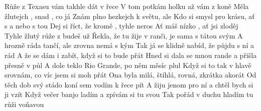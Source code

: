 \begin{TEXT}{Růže z Texasu}
\SLOKA {} vám takhle  dát  v řece \NL
V tom potkám holku  až  vám z koně \NL
Měla  žlutejch , snad , co já \NL
Znám plno hezkejch  k světu, ale   
\REFREN Kdo si  smysl pro krásu, ať s  a nebo s tou\NL
Dej si říct, že kromě , tyhle  neros\NL
Ať máš  nízko , ať jsi  zloděj \NL
Tyhle žlutý růže z  budeš   už 
\SLOKA Řekla, že tu žije v ranči, je sama s tátou svým\NL
A hrozně ráda tančí, ale zrovna nemá s kým\NL
Tak já se klidně nabíd, že půjdu s ní a rád\NL
A že se dám i zabít, když si to bude přát
\REFRENHRAJ
\SLOKA Hned si dala se mnou rande a přišla přesně v půl\NL
A dole teklo Rio Grande, po něm měsíc plul\NL
Když si to tak v hlavě srovnám, co víc jsem si moh přát\NL
Ona byla milá, štíhlá, rovná, zkrátka akorát
\REFRENHRAJ
\SLOKA Od těch dob svý stádo koní sem vodím k řece pít\NL
A žiju jenom pro ní a chtěl bych si ji vzít\NL
Když večer banjo ladím a zpívám si tu svou\NL
Tak pořád v duchu hladím tu růži voňavou
\REFRENHRAJ

\end{TEXT}